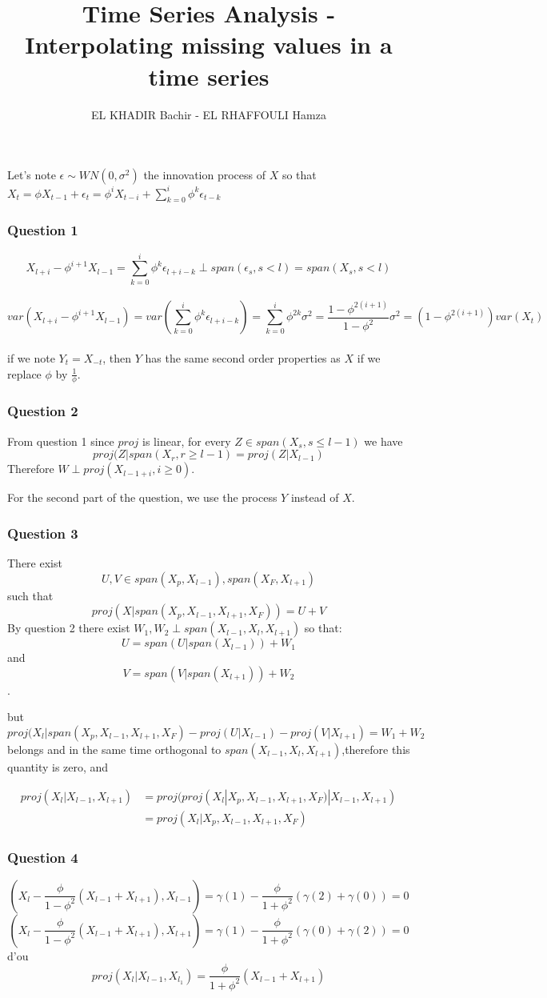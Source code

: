 \documentclass[12pt,french]{article}
\newcommand{\Q}[1]{\subsubsection*{Question #1}}
\begin{document}
\title{Time Series Analysis - Interpolating missing values in a time series}
\author{EL KHADIR Bachir - EL RHAFFOULI Hamza}


\maketitle


Let's note $\epsilon \sim WN(0, \sigma^2)$ the innovation process of $X$ so that $X_t = \phi X_{t-1} + \epsilon_t = \phi^i X_{t-i} + \sum_{k=0}^i \phi^k \epsilon_{t-k}$

\Q{1}
$$X_{l+i} - \phi^{i+1}X_{l-1} = \sum_{k=0}^{i} \phi^k \epsilon_{l+i-k} \perp span(\epsilon_s, s < l) = span(X_s, s < l)$$ \\
$$var(X_{l+i} - \phi^{i+1}X_{l-1}) = var(\sum_{k=0}^{i} \phi^k \epsilon_{l+i-k}) = \sum_{k=0}^{i} \phi^{2k} \sigma^2 = \frac{1-\phi^{2(i+1)}}{1-\phi^2} \sigma^2 = (1-\phi^{2(i+1)}) var(X_t)$$ \\
if we note $Y_t = X_{-t}$, then $Y$ has the same second order properties as $X$ if we replace $\phi$ by $\frac{1}{\phi}$.

\Q{2}
From question 1 since $proj$ is linear, for every $Z \in span(X_s, s \leq l-1)$ we have $$proj(Z | span(X_r, r \geq l-1) = proj(Z | X_{l-1})$$
Therefore $W \perp proj(X_{l-1+i}, i \geq 0)$.

For the second part of the question, we use the process $Y$ instead of $X$.

\Q{3}
There exist $$U, V \in span(X_p, X_{l-1}), span(X_F, X_{l+1})$$
such that $$proj(X|span(X_p, X_{l-1}, X_{l+1}, X_F)) = U + V$$
By question 2 there exist $W_1, W_2 \perp span(X_{l-1}, X_l, X_{l+1})$ so that:
$$U = span(U|span(X_{l-1})) + W_1$$ and
$$V = span(V|span(X_{l+1})) + W_2$$ .

but $$proj(X_l|span(X_p, X_{l-1}, X_{l+1}, X_F) - proj(U|X_{l-1}) - proj(V|X_{l+1}) = W_1 + W_2$$
belongs and in the same time orthogonal to $span(X_{l-1}, X_l, X_{l+1})$,therefore this quantity is zero, and


\begin{align*}
  proj(X_l | X_{l-1}, X_{l+1}) &= proj(proj(X_l| X_p, X_{l-1}, X_{l+1}, X_F) | X_{l-1}, X_{l+1}) \\
&= proj(X_l| X_p, X_{l-1}, X_{l+1}, X_F)
\end{align*}
  
\Q{4}

$$ (X_l - \frac{\phi}{1-\phi^2} (X_{l-1}+X_{l+1}), X_{l-1}) = \gamma(1) - \frac{\phi}{1+\phi^2} (\gamma(2)+\gamma(0)) = 0$$
$$ (X_l - \frac{\phi}{1-\phi^2} (X_{l-1}+X_{l+1}), X_{l+1}) = \gamma(1) - \frac{\phi}{1+\phi^2} (\gamma(0)+\gamma(2)) = 0$$
d'ou
$$ proj(X_l|X_{l-1}, X_{l_1})=\frac{\phi}{1+\phi^2} (X_{l-1}+X_{l+1})$$
\end{document}

